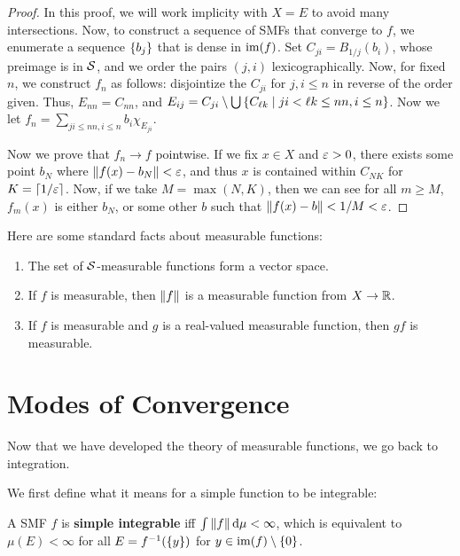 \begin{proof}
    In this proof, we will work implicity with $X = E$ to avoid many intersections. Now, to construct a sequence of SMFs that converge to $f$, we enumerate a sequence $\qty{b_j}$ that is dense in $\operatorname{im}(f)$. Set $C_{ji} = B_{1/j}(b_i)$, whose preimage is in $\mathcal S$, and we order the pairs $(j, i)$ lexicographically. Now, for fixed $n$, we construct $f_n$ as follows: disjointize the $C_{ji}$ for $j, i \le n$ in reverse of the order given. Thus, $E_{nn} = C_{nn}$, and $E_{ij} = C_{ji} \setminus \bigcup \qty{ C_{\ell k} \mid ji < \ell k \le nn, i \le n}$. Now we let $f_n = \sum_{ji \le nn, i \le n} b_i \chi_{E_{ji}}$.

    Now we prove that $f_n \to f$ pointwise. If we fix $x \in X$ and $\varepsilon > 0$, there exists some point $b_N$ where $\norm{f(x) - b_N} < \varepsilon$, and thus $x$ is contained within $C_{NK}$ for $K = \lceil 1/\varepsilon \rceil$. Now, if we take $M = \max(N, K)$, then we can see for all $m \ge M$, $f_m(x)$ is either $b_N$, or some other $b$ such that $\norm{f(x) - b} < 1/M < \varepsilon$.
\end{proof}

Here are some standard facts about measurable functions:

\begin{proposition}
    \begin{enumerate}
        \item The set of $\mathcal S$-measurable functions form a vector space.
        \item If $f$ is measurable, then $\norm{f}$ is a measurable function from $X \to \mathbb R$.
        \item If $f$ is measurable and $g$ is a real-valued measurable function, then $gf$ is measurable. 
    \end{enumerate}
\end{proposition}

\section{Modes of Convergence}

Now that we have developed the theory of measurable functions, we go back to integration.

We first define what it means for a simple function to be integrable:

\begin{definition}
    A SMF $f$ is \textbf{simple integrable} iff $\int \norm{f} \dd{\mu} < \infty$, which is equivalent to $\mu(E) < \infty$ for all $E = f^{-1}(\qty{y})$ for $y \in \operatorname{im}(f) \setminus \qty{0}$.
\end{definition}

